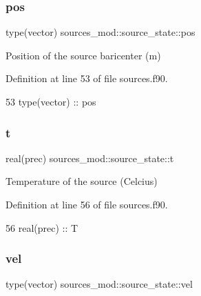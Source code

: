 \subsubsection{\texorpdfstring{pos}{pos}}
{\footnotesize\ttfamily type(vector) sources\+\_\+mod\+::source\+\_\+state\+::pos\hspace{0.3cm}{\ttfamily [private]}}



Position of the source baricenter (m) 



Definition at line 53 of file sources.\+f90.


\begin{DoxyCode}
53         \textcolor{keywordtype}{type}(vector) :: pos
\end{DoxyCode}
\mbox{\label{structsources__mod_1_1source__state_a7d51970a13f9664bbaf9d09afea0b363}} 
\subsubsection{\texorpdfstring{t}{t}}
{\footnotesize\ttfamily real(prec) sources\+\_\+mod\+::source\+\_\+state\+::t\hspace{0.3cm}{\ttfamily [private]}}



Temperature of the source (Celcius) 



Definition at line 56 of file sources.\+f90.


\begin{DoxyCode}
56         \textcolor{keywordtype}{real(prec)} :: T
\end{DoxyCode}
\mbox{\label{structsources__mod_1_1source__state_a52c6f025eb262a7a07b2a8b4ec7065ac}} 
\subsubsection{\texorpdfstring{vel}{vel}}
{\footnotesize\ttfamily type(vector) sources\+\_\+mod\+::source\+\_\+state\+::vel\hspace{0.3cm}{\ttfamily [private]}}



